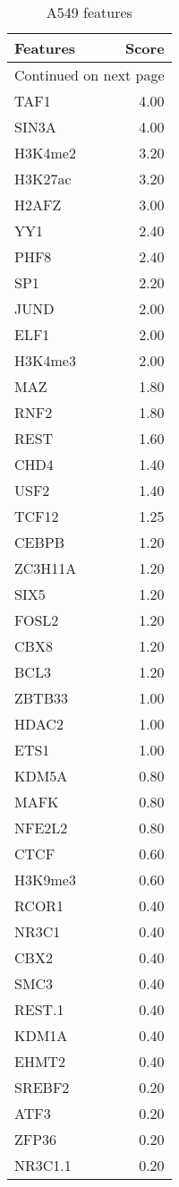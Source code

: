 \begin{longtable}{lr}
\caption{A549 features}\\
\toprule
Features &  Score \\
\midrule
\endhead
\midrule
\multicolumn{2}{r}{{Continued on next page}} \\
\midrule
\endfoot

\bottomrule
\endlastfoot
    TAF1 &   4.00 \\
   SIN3A &   4.00 \\
 H3K4me2 &   3.20 \\
 H3K27ac &   3.20 \\
   H2AFZ &   3.00 \\
     YY1 &   2.40 \\
    PHF8 &   2.40 \\
     SP1 &   2.20 \\
    JUND &   2.00 \\
    ELF1 &   2.00 \\
 H3K4me3 &   2.00 \\
     MAZ &   1.80 \\
    RNF2 &   1.80 \\
    REST &   1.60 \\
    CHD4 &   1.40 \\
    USF2 &   1.40 \\
   TCF12 &   1.25 \\
   CEBPB &   1.20 \\
 ZC3H11A &   1.20 \\
    SIX5 &   1.20 \\
   FOSL2 &   1.20 \\
    CBX8 &   1.20 \\
    BCL3 &   1.20 \\
  ZBTB33 &   1.00 \\
   HDAC2 &   1.00 \\
    ETS1 &   1.00 \\
   KDM5A &   0.80 \\
    MAFK &   0.80 \\
  NFE2L2 &   0.80 \\
    CTCF &   0.60 \\
 H3K9me3 &   0.60 \\
   RCOR1 &   0.40 \\
   NR3C1 &   0.40 \\
    CBX2 &   0.40 \\
    SMC3 &   0.40 \\
  REST.1 &   0.40 \\
   KDM1A &   0.40 \\
   EHMT2 &   0.40 \\
  SREBF2 &   0.20 \\
    ATF3 &   0.20 \\
   ZFP36 &   0.20 \\
 NR3C1.1 &   0.20 \\
\end{longtable}
